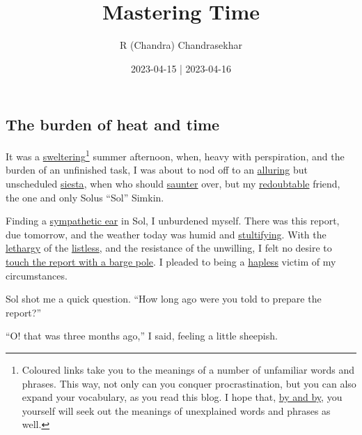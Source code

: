 \documentclass[
  a4paper,
]{article}
\title{Mastering Time}
\author{R (Chandra) Chandrasekhar}
\date{2023-04-15 | 2023-04-16}
\begin{document}
\maketitle

\thispagestyle{empty}


\hypertarget{the-burden-of-heat-and-time}{%
\subsection{The burden of heat and
time}\label{the-burden-of-heat-and-time}}

It was a
\href{https://dictionary.cambridge.org/dictionary/english/sweltering}{sweltering}\footnote{Coloured
  links take you to the meanings of a number of unfamiliar words and
  phrases. This way, not only can you conquer procrastination, but you
  can also expand your vocabulary, as you read this blog. I hope that,
  \href{https://dictionary.cambridge.org/dictionary/english/by-and-by}{by
  and by}, you yourself will seek out the meanings of unexplained words
  and phrases as well.} summer afternoon, when, heavy with perspiration,
and the burden of an unfinished task, I was about to nod off to an
\href{https://www.thefreedictionary.com/alluring}{alluring} but
unscheduled
\href{https://www.collinsdictionary.com/dictionary/english/siesta}{siesta},
when who should
\href{https://www.thefreedictionary.com/saunter}{saunter} over, but my
\href{https://www.vocabulary.com/dictionary/redoubtable}{redoubtable}
friend, the one and only Solus ``Sol'' Simkin.

Finding a
\href{https://www.macmillandictionary.com/dictionary/british/a-sympathetic-ear}{sympathetic
ear} in Sol, I unburdened myself. There was this report, due tomorrow,
and the weather today was humid and
\href{https://www.macmillandictionary.com/dictionary/british/stultifying}{stultifying}.
With the
\href{https://www.merriam-webster.com/dictionary/lethargy}{lethargy} of
the \href{https://www.thefreedictionary.com/listless}{listless}, and the
resistance of the unwilling, I felt no desire to
\href{https://idioms.thefreedictionary.com/I+wouldn\%27t+touch+with+a+barge+pole}{touch
the report with a barge pole}. I pleaded to being a
\href{https://www.dictionary.com/browse/hapless}{hapless} victim of my
circumstances.

Sol shot me a quick question. ``How long ago were you told to prepare
the report?''

``O! that was three months ago,'' I said, feeling a little sheepish.
\end{document}
